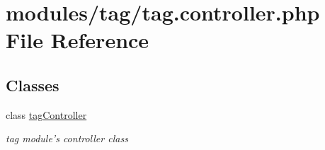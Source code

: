 \hypertarget{tag_8controller_8php}{\section{modules/tag/tag.controller.\+php File Reference}
\label{tag_8controller_8php}
}
\subsection*{Classes}
\begin{DoxyCompactItemize}
\item 
class \hyperlink{classtagController}{tag\+Controller}
\begin{DoxyCompactList}\small\item\em tag module's controller class \end{DoxyCompactList}\end{DoxyCompactItemize}
